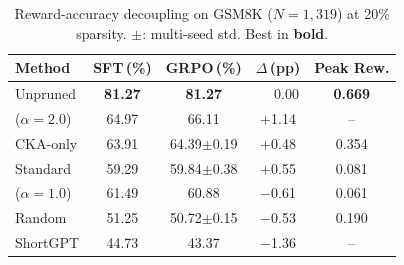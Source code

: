 \begin{table}[t]
\centering
\small
\caption{Reward-accuracy decoupling on GSM8K ($N{=}1{,}319$) at 20\% sparsity. $\pm$: multi-seed std. Best in \textbf{bold}.}
\label{tab:decoupling}
\setlength{\tabcolsep}{4pt}
\begin{tabular}{@{}lcccc@{}}
\toprule
Method & SFT\,(\%) & GRPO\,(\%) & $\Delta$\,(pp) & Peak Rew. \\
\midrule
Unpruned & \textbf{81.27} & \textbf{81.27} & $\phantom{-}$0.00 & \textbf{0.669} \\
\rasp{} ($\alpha{=}2.0$) & 64.97 & 66.11 & $+$1.14 & -- \\
CKA-only & 63.91 & 64.39{\scriptsize$\pm$0.19} & $+$0.48 & 0.354 \\
Standard & 59.29 & 59.84{\scriptsize$\pm$0.38} & $+$0.55 & 0.081 \\
\rasp{} ($\alpha{=}1.0$) & 61.49 & 60.88 & $-$0.61 & 0.061 \\
Random & 51.25 & 50.72{\scriptsize$\pm$0.15} & $-$0.53 & 0.190 \\
\midrule
ShortGPT & 44.73 & 43.37 & $-$1.36 & -- \\
\bottomrule
\end{tabular}
\end{table}
